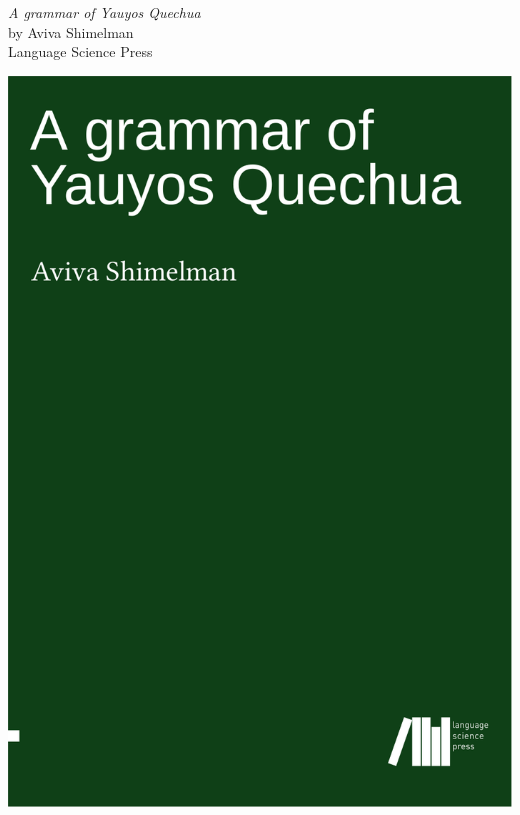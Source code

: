     \restoregeometry

    \vfill
    \begin{minipage}{0.6\linewidth}\raggedright\Large
            \textit{A grammar of Yauyos Quechua}\\
            by Aviva Shimelman\\
            Language Science Press
        \end{minipage}\begin{minipage}{0.4\linewidth}\raggedleft
            \includegraphics[width=\linewidth]{./FullPages/CoverAviva-crop.pdf}
    \end{minipage}

